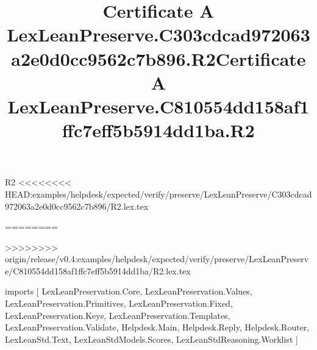 \begin{lexlean}{R2}
<<<<<<<< HEAD:examples/helpdesk/expected/verify/preserve/LexLeanPreserve/C303cdcad972063a2e0d0cc9562c7b896/R2.lex.tex
\title{Certificate A LexLeanPreserve.C303cdcad972063a2e0d0cc9562c7b896.R2}
========
\title{Certificate A LexLeanPreserve.C810554dd158af1ffc7eff5b5914dd1ba.R2}
>>>>>>>> origin/release/v0.4:examples/helpdesk/expected/verify/preserve/LexLeanPreserve/C810554dd158af1ffc7eff5b5914dd1ba/R2.lex.tex
\begin{coremodule}
imports [
  LexLeanPreservation.Core,
  LexLeanPreservation.Values,
  LexLeanPreservation.Primitives,
  LexLeanPreservation.Fixed,
  LexLeanPreservation.Keys,
  LexLeanPreservation.Templates,
  LexLeanPreservation.Validate,
  Helpdesk.Main,
  Helpdesk.Reply,
  Helpdesk.Router,
  LexLeanStd.Text,
  LexLeanStdModels.Scores,
  LexLeanStdReasoning.Worklist
]


\end{coremodule}
\end{lexlean}
